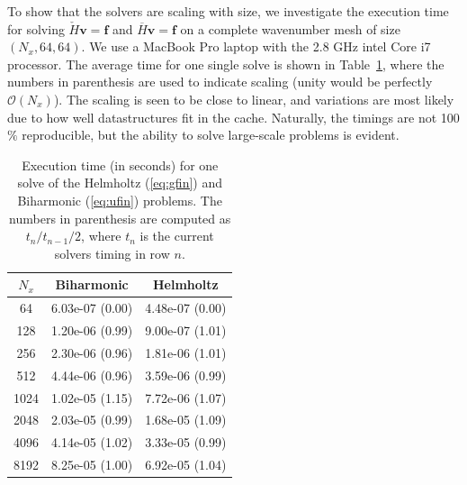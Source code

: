 \documentclass[preprint]{elsarticle}
\newcommand{\N}[1]{\check{#1}}
\newcommand{\D}[1]{\overline{#1}}
\begin{document}
To show that the solvers are scaling with size, we investigate the execution time 
for solving $\N{H} \bm{v} = \bm{f}$ and $\D{H} \bm{v} = \bm{f}$ on a complete 
wavenumber mesh of size $(N_x,64,64)$. We use a MacBook Pro laptop with the 2.8 GHz intel Core i7 processor. The average time for one single solve is shown in Table~\ref{tab:timings}, where the numbers in parenthesis are used to indicate scaling (unity would be perfectly $\mathcal{O}(N_x)$). The scaling is seen to be close to linear, and variations 
are most likely due to how well datastructures fit in the cache. Naturally, the timings are not 100$\%$ reproducible, but the ability to solve large-scale problems is evident.
\begin{table}
	\centering
	\caption{Execution time (in seconds) for one solve  of the Helmholtz 
	(\ref{eq:gfin}) and Biharmonic 
	(\ref{eq:ufin}) problems. The numbers in parenthesis are computed as $t_n / t_{n-1} / 2$, where $t_n$ is the current solvers timing in row $n$. 	\label{tab:timings}}
	\begin{tabular}{ccc}
$N_x$ & Biharmonic & Helmholtz \\ 
\hline
64 & 6.03e-07 (0.00) & 4.48e-07 (0.00) \\ 
128 & 1.20e-06 (0.99) & 9.00e-07 (1.01) \\ 
256 & 2.30e-06 (0.96) & 1.81e-06 (1.01) \\ 
512 & 4.44e-06 (0.96) & 3.59e-06 (0.99) \\ 
1024 & 1.02e-05 (1.15) & 7.72e-06 (1.07) \\ 
2048 & 2.03e-05 (0.99) & 1.68e-05 (1.09) \\ 
4096 & 4.14e-05 (1.02) & 3.33e-05 (0.99) \\ 
8192 & 8.25e-05 (1.00) & 6.92e-05 (1.04)
	\end{tabular}
\end{table}
\end{document}

